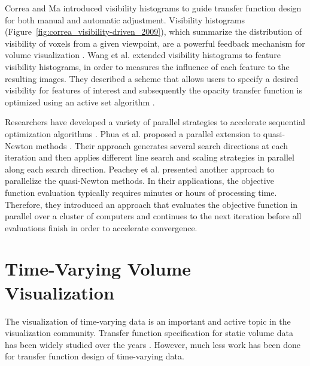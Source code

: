 \documentclass{egpubl}
\begin{document}
Correa and Ma \cite{correa_visibility-driven_2009} introduced visibility histograms to guide transfer function design for both manual and automatic adjustment.
Visibility histograms (Figure~\ref{fig:correa_visibility-driven_2009}), which summarize the distribution of visibility of voxels from a given viewpoint, are a powerful feedback mechanism for volume visualization \cite{emsenhuber_visibility_2008}.
Wang et al. \cite{wang_efficient_2011} extended visibility histograms to feature visibility histograms, in order to measures the influence of each feature to the resulting images. They described a scheme that allows users to specify a desired visibility for features of interest and subsequently the opacity transfer function is optimized using an active set algorithm \cite{polyak_conjugate_1969}.

Researchers have developed a variety of parallel strategies to accelerate sequential optimization algorithms \cite{spedicato_algorithms_2012}.
Phua et al. \cite{phua_parallel_1998} proposed a parallel extension to quasi-Newton methods \cite{yang_optimization_2001}. Their approach generates several search directions at each iteration and then applies different line search and scaling strategies in parallel along each search direction.
Peachey et al. \cite{peachey_parallel_2009} presented another approach to parallelize the quasi-Newton methods.
In their applications, the objective function evaluation typically requires minutes or hours of processing time. Therefore, they introduced an approach that evaluates the objective function in parallel over a cluster of computers and continues to the next iteration before all evaluations finish in order to accelerate convergence.

\section{Time-Varying Volume Visualization}
The visualization of time-varying data is an important and active topic in the visualization community. Transfer function specification for static volume data has been widely studied over the years \cite{pfister_transfer_2001}. However, much less work has been done for transfer function design of time-varying data.
\end{document}
